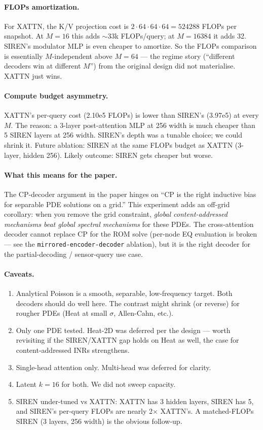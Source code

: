 \documentclass[11pt]{article}
\begin{document}
\paragraph{FLOPs amortization.} For XATTN, the K/V projection cost is
$2 \cdot 64 \cdot 64 \cdot 64 = 524288$ FLOPs per snapshot. At $M=16$ this
adds $\sim$33k FLOPs/query; at $M=16384$ it adds 32. SIREN's modulator MLP
is even cheaper to amortize. So the FLOPs comparison is essentially
$M$-independent above $M=64$ --- the regime story (``different decoders win
at different $M$'') from the original design did not materialise. XATTN
just wins.

\paragraph{Compute budget asymmetry.} XATTN's per-query cost
(2.10e5 FLOPs) is lower than SIREN's (3.97e5) at every $M$. The reason: a
3-layer post-attention MLP at 256 width is much cheaper than 5 SIREN
layers at 256 width. SIREN's depth was a tunable choice; we could shrink
it. Future ablation: SIREN at the same FLOPs budget as XATTN (3-layer,
hidden 256). Likely outcome: SIREN gets cheaper but worse.

\paragraph{What this means for the paper.} The CP-decoder argument in the
paper hinges on ``CP is the right inductive bias for separable PDE
solutions on a grid.'' This experiment adds an off-grid corollary: when
you remove the grid constraint, \emph{global content-addressed mechanisms
beat global spectral mechanisms} for these PDEs. The cross-attention
decoder cannot replace CP for the ROM solve (per-node EQ evaluation is
broken --- see the \texttt{mirrored-encoder-decoder} ablation), but it is
the right decoder for the partial-decoding / sensor-query use case.

\paragraph{Caveats.}
\begin{enumerate}
\item Analytical Poisson is a smooth, separable, low-frequency target.
      Both decoders should do well here. The contrast might shrink (or
      reverse) for rougher PDEs (Heat at small $\sigma$, Allen-Cahn, etc.).
\item Only one PDE tested. Heat-2D was deferred per the design --- worth
      revisiting if the SIREN/XATTN gap holds on Heat as well, the case
      for content-addressed INRs strengthens.
\item Single-head attention only. Multi-head was deferred for clarity.
\item Latent $k=16$ for both. We did not sweep capacity.
\item SIREN under-tuned vs XATTN: XATTN has 3 hidden layers, SIREN has 5,
      and SIREN's per-query FLOPs are nearly 2$\times$ XATTN's. A matched-FLOPs
      SIREN (3 layers, 256 width) is the obvious follow-up.
\end{enumerate}
\end{document}
